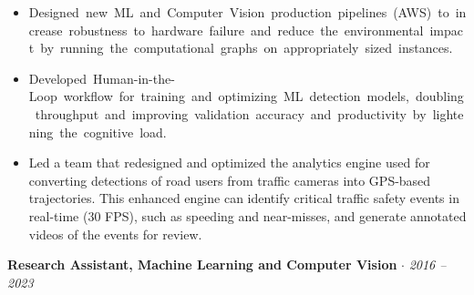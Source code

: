 \documentclass[11pt]{article}
\makeatletter
\newcommand{\hl}[1]{%
    \setbox\@tempboxa\hbox{#1}%
    \ifdim\wd\@tempboxa>\linewidth
    \noindent
    \fcolorbox{black}{white}{%
        \parbox[m]{\dimexpr\linewidth-2\fboxsep}{{\large \onehalfspacing #1}}
          
    }%
    \else
    \fcolorbox{black}{white}{#1}%
    \fi
}%
\newcommand{\checkthis}{{\small \faIcon{star}}}
\makeatother
\begin{document}
\begin{rightrule}
    \begin{itemize}[left=5pt]
    \item[\checkthis] \hl{Designed new ML and Computer Vision production pipelines (AWS) to increase robustness to hardware failure and reduce the environmental impact by running the computational graphs on appropriately sized instances.}
    \item[\checkthis] \hl {Developed Human-in-the-Loop workflow for training and optimizing ML detection models, doubling throughput and improving validation accuracy and productivity by lightening the cognitive load.}
    \item Led a team that redesigned and optimized the analytics engine used for converting detections of road users from traffic cameras into GPS-based trajectories. This enhanced engine can identify critical traffic safety events in real-time (30 FPS), such as speeding and near-misses, and generate annotated videos of the events for review. %
    \end{itemize}
\end{rightrule}
\vspace{-2mm}
\textbf{Research Assistant, Machine Learning and Computer Vision} \enskip $\cdot$  \hfill \textit{\footnotesize 2016 -- 2023} 
\end{document}
